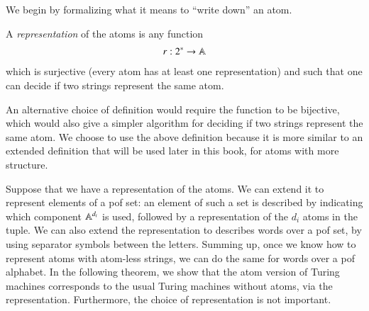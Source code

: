 We begin by formalizing what it means to ``write down'' an atom.



\begin{definition}\label{def:representation-equality}
    A \emph{representation} of the atoms is any function 
    \begin{align*}
    r : 2^* \to \mathbb A
    \end{align*}
    which is surjective (every atom has at least one representation) and such that one can decide if two strings represent the same atom.
\end{definition}

An alternative choice of definition would require the function to be bijective, which would also give a simpler algorithm for deciding if two strings represent the same atom. We choose to use the above definition because it is more similar to an extended definition that will be used later in this book, for atoms with more structure.

Suppose that we have a representation of the atoms. We can extend  it to represent elements of a pof set: an element of such a set is described by indicating which component $\mathbb A^{d_i}$ is used,  followed by a representation of the $d_i$ atoms  in the tuple. We can also extend the representation to describes words over a pof set, by using separator symbols between the letters. Summing up, once we know how to represent atoms with atom-less strings, we can do the same for words over a pof alphabet.  In the following theorem, we show that the atom version of Turing machines corresponds to the usual Turing machines without atoms, via the representation. Furthermore, the choice of  representation is not important. 

